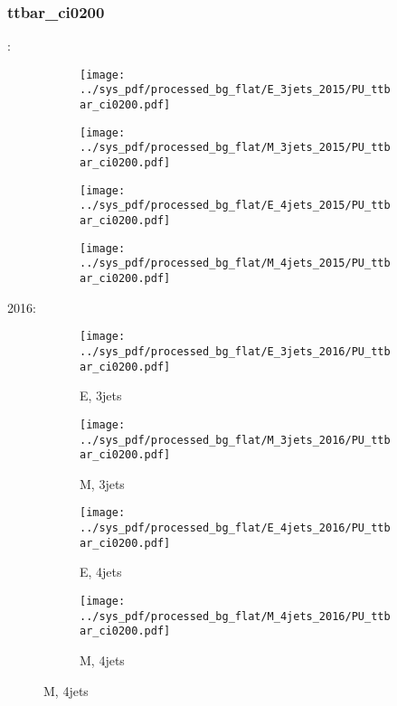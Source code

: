 \documentclass{beamer}
\begin{document}
\begin{frame}
\frametitle{ttbar_ci0200}
\fontsize{5}{1}:
\begin{figure}
\centering
\begin{subfigure}[b]{0.24\textwidth}
\texttt{[image: ../sys\_pdf/processed\_bg\_flat/E\_3jets\_2015/PU\_ttbar\_ci0200.pdf]}
\end{subfigure}
\begin{subfigure}[b]{0.24\textwidth}
\texttt{[image: ../sys\_pdf/processed\_bg\_flat/M\_3jets\_2015/PU\_ttbar\_ci0200.pdf]}
\end{subfigure}
\begin{subfigure}[b]{0.24\textwidth}
\texttt{[image: ../sys\_pdf/processed\_bg\_flat/E\_4jets\_2015/PU\_ttbar\_ci0200.pdf]}
\end{subfigure}
\begin{subfigure}[b]{0.24\textwidth}
\texttt{[image: ../sys\_pdf/processed\_bg\_flat/M\_4jets\_2015/PU\_ttbar\_ci0200.pdf]}
\end{subfigure}
\end{figure}
2016:
\begin{figure}
\centering
\begin{subfigure}[b]{0.24\textwidth}
\texttt{[image: ../sys\_pdf/processed\_bg\_flat/E\_3jets\_2016/PU\_ttbar\_ci0200.pdf]}
\captionsetup{font=tiny}
\caption{E, 3jets}
\end{subfigure}
\begin{subfigure}[b]{0.24\textwidth}
\texttt{[image: ../sys\_pdf/processed\_bg\_flat/M\_3jets\_2016/PU\_ttbar\_ci0200.pdf]}
\captionsetup{font=tiny}
\caption{M, 3jets}
\end{subfigure}
\begin{subfigure}[b]{0.24\textwidth}
\texttt{[image: ../sys\_pdf/processed\_bg\_flat/E\_4jets\_2016/PU\_ttbar\_ci0200.pdf]}
\captionsetup{font=tiny}
\caption{E, 4jets}
\end{subfigure}
\begin{subfigure}[b]{0.24\textwidth}
\texttt{[image: ../sys\_pdf/processed\_bg\_flat/M\_4jets\_2016/PU\_ttbar\_ci0200.pdf]}
\captionsetup{font=tiny}
\caption{M, 4jets}
\end{subfigure}
\end{figure}
\end{frame}
\end{document}

